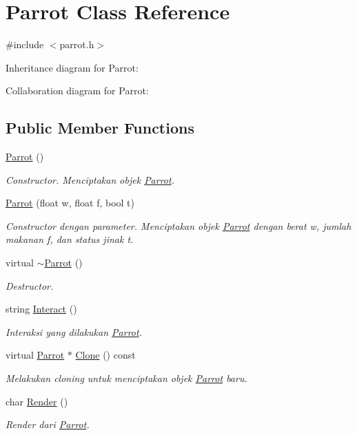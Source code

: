 \hypertarget{classParrot}{}\section{Parrot Class Reference}
\label{classParrot}


{\ttfamily \#include $<$parrot.\+h$>$}



Inheritance diagram for Parrot\+:


Collaboration diagram for Parrot\+:
\subsection*{Public Member Functions}
\begin{DoxyCompactItemize}
\item 
\hyperlink{classParrot_adfd08f638064b09dc46924ded14d1b32}{Parrot} ()
\begin{DoxyCompactList}\small\item\em Constructor. Menciptakan objek \hyperlink{classParrot}{Parrot}. \end{DoxyCompactList}\item 
\hyperlink{classParrot_a98ad57fac6ea488daf92b33c2d8ae57f}{Parrot} (float w, float f, bool t)
\begin{DoxyCompactList}\small\item\em Constructor dengan parameter. Menciptakan objek \hyperlink{classParrot}{Parrot} dengan berat w, jumlah makanan f, dan status jinak t. \end{DoxyCompactList}\item 
virtual \hyperlink{classParrot_a02300897ced64c5a28347d385f4f0f00}{$\sim$\+Parrot} ()
\begin{DoxyCompactList}\small\item\em Destructor. \end{DoxyCompactList}\item 
string \hyperlink{classParrot_a3fdf1aa0851d53d31b5d225d755e4995}{Interact} ()
\begin{DoxyCompactList}\small\item\em Interaksi yang dilakukan \hyperlink{classParrot}{Parrot}. \end{DoxyCompactList}\item 
virtual \hyperlink{classParrot}{Parrot} $\ast$ \hyperlink{classParrot_aec7fd1385827d67522e1baf3242078b0}{Clone} () const 
\begin{DoxyCompactList}\small\item\em Melakukan cloning untuk menciptakan objek \hyperlink{classParrot}{Parrot} baru. \end{DoxyCompactList}\item 
char \hyperlink{classParrot_a27c491ab4ae56491fbe8d74e494bc46d}{Render} ()
\begin{DoxyCompactList}\small\item\em Render dari \hyperlink{classParrot}{Parrot}. \end{DoxyCompactList}\end{DoxyCompactItemize}

